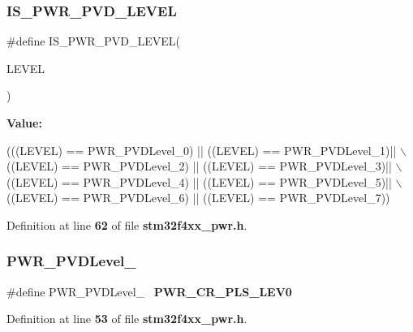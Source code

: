 \subsubsection{I\+S\+\_\+\+P\+W\+R\+\_\+\+P\+V\+D\+\_\+\+L\+E\+V\+EL}
{\footnotesize\ttfamily \#define I\+S\+\_\+\+P\+W\+R\+\_\+\+P\+V\+D\+\_\+\+L\+E\+V\+EL(\begin{DoxyParamCaption}\item[{}]{L\+E\+V\+EL }\end{DoxyParamCaption})}

{\bfseries Value\+:}
\begin{DoxyCode}
(((LEVEL) == PWR_PVDLevel_0) || ((LEVEL) == PWR_PVDLevel_1)|| \(\backslash\)
                                 ((LEVEL) == PWR_PVDLevel_2) || ((LEVEL) == 
      PWR_PVDLevel_3)|| \(\backslash\)
                                 ((LEVEL) == PWR_PVDLevel_4) || ((LEVEL) == 
      PWR_PVDLevel_5)|| \(\backslash\)
                                 ((LEVEL) == PWR_PVDLevel_6) || ((LEVEL) == 
      PWR_PVDLevel_7))
\end{DoxyCode}


Definition at line \textbf{ 62} of file \textbf{ stm32f4xx\+\_\+pwr.\+h}.

\mbox{\label{group__PWR__PVD__detection__level_gac8ec8a52046b242f03dcf8a4f32fb04b}} 
\subsubsection{P\+W\+R\+\_\+\+P\+V\+D\+Level\+\_}
{\footnotesize\ttfamily \#define P\+W\+R\+\_\+\+P\+V\+D\+Level\+\_~\textbf{ P\+W\+R\+\_\+\+C\+R\+\_\+\+P\+L\+S\+\_\+\+L\+E\+V0}}



Definition at line \textbf{ 53} of file \textbf{ stm32f4xx\+\_\+pwr.\+h}.

\mbox{\label{group__PWR__PVD__detection__level_ga0d090f9683877c0e8a5546a56d5ad888}} 
